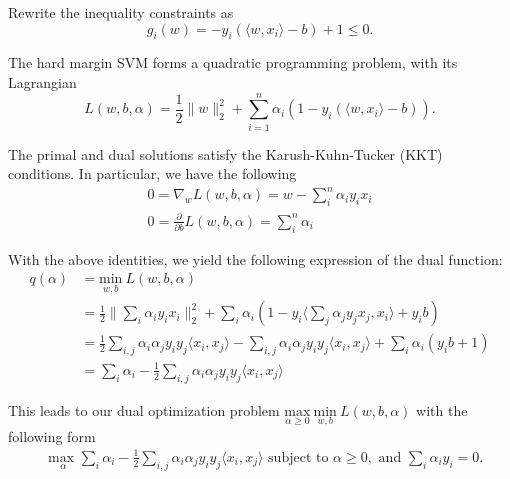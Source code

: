 \documentclass[10pt]{article}
\begin{document}
Rewrite the inequality constraints as 
\begin{equation}
	g_i(w) = -y_i(\langle w,x_i\rangle - b) + 1 \leq 0.
\end{equation}

The hard margin SVM forms a quadratic programming problem, with its Lagrangian
\begin{equation}
	L(w,b,\alpha) = \frac{1}{2} \lVert w \rVert_{2}^2 + \sum_{i=1}^{n}\alpha_i(1 - y_i(\langle w,x_i \rangle - b)). 
\end{equation} 

The primal and dual solutions satisfy the Karush-Kuhn-Tucker (KKT) conditions. In particular, we have the following
\begin{subequations}\label{eq:4}
\begin{align}
0 = \nabla_{w} L(w,b,\alpha) = w - \sum_{i}^{n}\alpha_i y_i x_i \label{eq:4a}\\
0 = \frac{\partial}{\partial b} L(w,b,\alpha) = \sum_{i}^{n}\alpha_i  \label{eq:4b}
\end{align}
\end{subequations}

With the above identities, we yield the following expression of the dual function:
\begin{equation}
\begin{aligned}
q(\alpha) 
& = \underset{w,b}{\text{min}}\: L(w,b,\alpha)\\
& = \frac{1}{2} \Bigg \lVert \sum_{i}^{}\alpha_i y_i x_i \Bigg \rVert_{2}^2  + \sum_{i}^{}\alpha_i (1-y_i \Bigg \langle \sum_{j}^{}\alpha_j y_j x_j,x_i \Bigg \rangle + y_i b )\\
& = \frac{1}{2} \sum_{i,j}^{}\alpha_i \alpha_j y_i y_j \langle x_i, x_j\rangle - \sum_{i,j}^{}\alpha_i \alpha_j y_i y_j \langle x_i, x_j\rangle + \sum_{i}^{}\alpha_i(y_i b + 1)\\
& = \sum_{i}^{}\alpha_i - \frac{1}{2} \sum_{i,j}^{}\alpha_i \alpha_j y_i y_j \langle x_i, x_j\rangle
\end{aligned}
\end{equation}
 

This leads to our dual optimization problem $\underset{\alpha \geq 0}{\text{max}} \: \underset{w,b}{\text{min}}\: L(w,b,\alpha)$ with the following form
\begin{equation} \label{eq:6}
\begin{aligned}
& \underset{\alpha}{\text{max }} 
\sum_{i}^{}\alpha_i - \frac{1}{2} \sum_{i,j}^{}\alpha_i \alpha_j y_i y_j \langle x_i, x_j\rangle
\text{ subject to }
\alpha \geq 0, \text{ and }
\sum_{i}^{} \alpha_i y_i = 0.
\end{aligned}
\end{equation}
\end{document}
